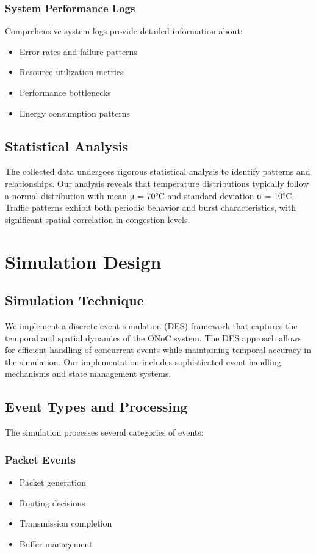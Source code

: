 \documentclass[12pt]{article}
\begin{document}
\subsubsection{System Performance Logs}
Comprehensive system logs provide detailed information about:
\begin{itemize}[noitemsep]
    \item Error rates and failure patterns
    \item Resource utilization metrics
    \item Performance bottlenecks
    \item Energy consumption patterns
\end{itemize}

\subsection{Statistical Analysis}
The collected data undergoes rigorous statistical analysis to identify patterns and relationships. Our analysis reveals that temperature distributions typically follow a normal distribution with mean μ = 70°C and standard deviation σ = 10°C. Traffic patterns exhibit both periodic behavior and burst characteristics, with significant spatial correlation in congestion levels.

\section{Simulation Design}
\subsection{Simulation Technique}
We implement a discrete-event simulation (DES) framework that captures the temporal and spatial dynamics of the ONoC system. The DES approach allows for efficient handling of concurrent events while maintaining temporal accuracy in the simulation. Our implementation includes sophisticated event handling mechanisms and state management systems.

\subsection{Event Types and Processing}
The simulation processes several categories of events:

\subsubsection{Packet Events}
\begin{itemize}[noitemsep]
    \item Packet generation
    \item Routing decisions
    \item Transmission completion
    \item Buffer management
\end{itemize}
\end{document}
